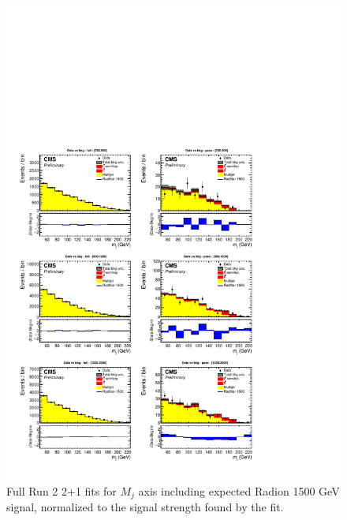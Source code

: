 \begin{figure}[!htb]
	\centering
	\includegraphics[width=1\textwidth]{Figures/postfit_projx_fits_21.pdf}
	\caption{Full Run 2 2$+$1 fits for $M_j$ axis including expected Radion 1500 GeV signal, normalized to the signal strength found by the fit.}
	\label{fig:21mj}
\end{figure}
